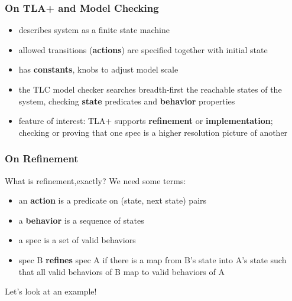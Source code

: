 \documentclass[
        11pt, %
]{beamer}
\begin{document}
\begin{frame}
    \frametitle{On TLA+ and Model Checking}
    \begin{itemize}
        \item describes system as a finite state machine
        \item allowed transitions ({\bf actions}) are specified together with initial state
        \item has {\bf constants}, knobs to adjust model scale
        \item the TLC model checker searches breadth-first the reachable states of the system, checking {\bf state} predicates and {\bf behavior} properties
        \item feature of interest: TLA+ supports {\bf refinement} or {\bf implementation}; checking or proving that one spec is a higher resolution picture of another
    \end{itemize}
\end{frame}

\begin{frame}
    \frametitle{On Refinement}
    What is refinement,exactly? We need some terms:\

    \begin{itemize}
        \item an {\bf action} is a predicate on (state, next state) pairs
        \item a {\bf behavior} is a sequence of states
        \item a spec is a set of valid behaviors
        \item spec B {\bf refines} spec A if there is a map from B's state into A's state such that all valid behaviors of B map to valid behaviors of A
    \end{itemize}
    Let's look at an example!
\end{frame}
\end{document}
